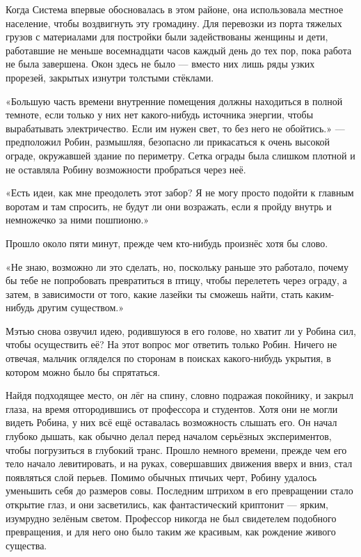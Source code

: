 \documentclass[a4paper,12pt]{book}
\begin{document}
\par
Когда Система впервые обосновалась в этом районе, она использовала местное население, чтобы воздвигнуть эту громадину. Для перевозки из порта тяжелых грузов с материалами для постройки были задействованы женщины и дети, работавшие не меньше восемнадцати часов каждый день до тех пор, пока работа не была завершена. Окон здесь не было — вместо них лишь ряды узких прорезей, закрытых изнутри толстыми стёклами.
\par
«Большую часть времени внутренние помещения должны находиться в полной темноте, если только у них нет какого-нибудь источника энергии, чтобы вырабатывать электричество. Если им нужен свет, то без него не обойтись.» — предположил Робин, размышляя, безопасно ли прикасаться к очень высокой ограде, окружавшей здание по периметру. Сетка ограды была слишком плотной и не оставляла Робину возможности пробраться через неё.
\par
«Есть идеи, как мне преодолеть этот забор? Я не могу просто подойти к главным воротам и там спросить, не будут ли они возражать, если я пройду внутрь и немножечко за ними пошпионю.»\\
\par
Прошло около пяти минут, прежде чем кто-нибудь произнёс хотя бы слово.\\
\par
«Не знаю, возможно ли это сделать, но, поскольку раньше это работало, почему бы тебе не попробовать превратиться в птицу, чтобы перелететь через ограду, а затем, в зависимости от того, какие лазейки ты сможешь найти, стать каким-нибудь другим существом.»
\par
Мэтью снова озвучил идею, родившуюся в его голове, но хватит ли у Робина сил, чтобы осуществить её? На этот вопрос мог ответить только Робин. Ничего не отвечая, мальчик огляделся по сторонам в поисках какого-нибудь укрытия, в котором можно было бы спрятаться.
\par
Найдя подходящее место, он лёг на спину, словно подражая покойнику, и закрыл глаза, на время отгородившись от профессора и студентов. Хотя они не могли видеть Робина, у них всё ещё оставалась возможность слышать его. Он начал глубоко дышать, как обычно делал перед началом серьёзных экспериментов, чтобы погрузиться в глубокий транс. Прошло немного времени, прежде чем его тело начало левитировать, и на руках, совершавших движения вверх и вниз, стал появляться слой перьев. Помимо обычных птичьих черт, Робину удалось уменьшить себя до размеров совы. Последним штрихом в его превращении стало открытие глаз, и они засветились, как фантастический криптонит — ярким, изумрудно зелёным светом. Профессор никогда не был свидетелем подобного превращения, и для него оно было таким же красивым, как рождение живого существа.\\
\end{document}
